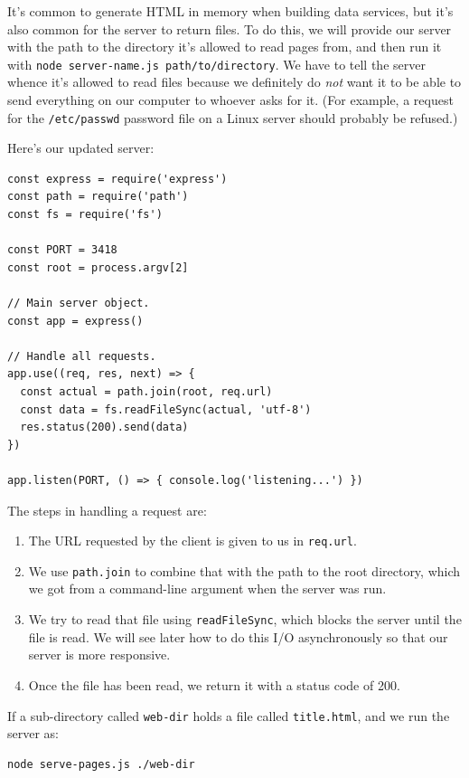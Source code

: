 It's common to generate HTML in memory when building data services, but
it's also common for the server to return files. To do this, we will
provide our server with the path to the directory it's allowed to read
pages from, and then run it with
\texttt{node\ server-name.js\ path/to/directory}. We have to tell the
server whence it's allowed to read files because we definitely do
\emph{not} want it to be able to send everything on our computer to
whoever asks for it. (For example, a request for the
\texttt{/etc/passwd} password file on a Linux server should probably be
refused.)

Here's our updated server:

\begin{verbatim}
const express = require('express')
const path = require('path')
const fs = require('fs')

const PORT = 3418
const root = process.argv[2]

// Main server object.
const app = express()

// Handle all requests.
app.use((req, res, next) => {
  const actual = path.join(root, req.url)
  const data = fs.readFileSync(actual, 'utf-8')
  res.status(200).send(data)
})

app.listen(PORT, () => { console.log('listening...') })
\end{verbatim}

The steps in handling a request are:

\begin{enumerate}
\tightlist
\item
  The URL requested by the client is given to us in \texttt{req.url}.
\item
  We use \texttt{path.join} to combine that with the path to the root
  directory, which we got from a command-line argument when the server
  was run.
\item
  We try to read that file using \texttt{readFileSync}, which blocks the
  server until the file is read. We will see later how to do this I/O
  asynchronously so that our server is more responsive.
\item
  Once the file has been read, we return it with a status code of 200.
\end{enumerate}

If a sub-directory called \texttt{web-dir} holds a file called
\texttt{title.html}, and we run the server as:

\begin{verbatim}
node serve-pages.js ./web-dir
\end{verbatim}

